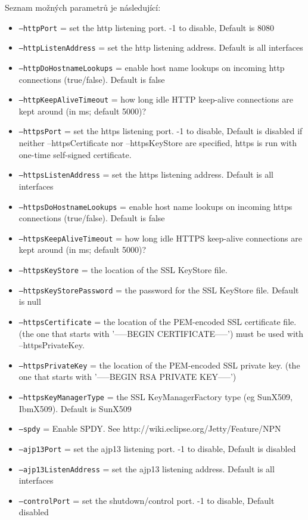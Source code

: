     \medskip
    Seznam možných parametrů je následující:
    \begin{itemize}
       \item{\texttt{--httpPort}               = set the http listening port. -1 to disable, Default is 8080}
       \item{\texttt{--httpListenAddress}      = set the http listening address. Default is all interfaces}
       \item{\texttt{--httpDoHostnameLookups}  = enable host name lookups on incoming http connections (true/false). Default is false}
       \item{\texttt{--httpKeepAliveTimeout}   = how long idle HTTP keep-alive connections are kept around (in ms; default 5000)?}
       \item{\texttt{--httpsPort}              = set the https listening port. -1 to disable, Default is disabled
                                  if neither --httpsCertificate nor --httpsKeyStore are specified,
                                  https is run with one-time self-signed certificate.}
       \item{\texttt{--httpsListenAddress}     = set the https listening address. Default is all interfaces}
       \item{\texttt{--httpsDoHostnameLookups} = enable host name lookups on incoming https connections (true/false). Default is false}
       \item{\texttt{--httpsKeepAliveTimeout}   = how long idle HTTPS keep-alive connections are kept around (in ms; default 5000)?}
       \item{\texttt{--httpsKeyStore}          = the location of the SSL KeyStore file.}
       \item{\texttt{--httpsKeyStorePassword}  = the password for the SSL KeyStore file. Default is null}
       \item{\texttt{--httpsCertificate}       = the location of the PEM-encoded SSL certificate file.
                                  (the one that starts with '-----BEGIN CERTIFICATE-----')
                                  must be used with --httpsPrivateKey.}
       \item{\texttt{--httpsPrivateKey}       = the location of the PEM-encoded SSL private key.
                                  (the one that starts with '-----BEGIN RSA PRIVATE KEY-----')}
       \item{\texttt{--httpsKeyManagerType}    = the SSL KeyManagerFactory type (eg SunX509, IbmX509). Default is SunX509}
       \item{\texttt{--spdy}               = Enable SPDY. See http://wiki.eclipse.org/Jetty/Feature/NPN}
       \item{\texttt{--ajp13Port}              = set the ajp13 listening port. -1 to disable, Default is disabled}
       \item{\texttt{--ajp13ListenAddress}     = set the ajp13 listening address. Default is all interfaces}
       \item{\texttt{--controlPort}            = set the shutdown/control port. -1 to disable, Default disabled}
       

\end{itemize}
